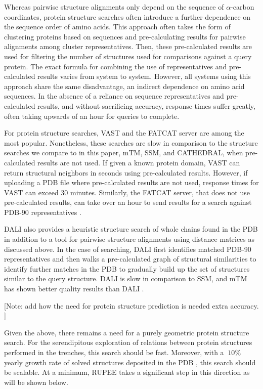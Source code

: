 \documentclass[10pt,letterpaper]{article}
\newcommand{\ca}{$\alpha$-carbon\xspace}
\begin{document}
Whereas pairwise structure alignments only depend on the sequence of \ca coordinates, protein structure searches often introduce a further dependence on the sequence order of amino acids.
This approach often takes the form of clustering proteins based on sequences and pre-calculating results for pairwise alignments among cluster representatives. 
Then, these pre-calculated results are used for filtering the number of structures used for comparisons against a query protein.
The exact formula for combining the use of representatives and pre-calculated results varies from system to system.
However, all systems using this approach share the same disadvantage, an indirect dependence on amino acid sequences. 
In the absence of a reliance on sequence representatives and pre-calculated results, and without sacrificing accuracy, response times suffer greatly, often taking upwards of an hour for queries to complete. 

For protein structure searches, VAST \cite{Gilbrat1996} and the FATCAT server \cite{Ye2004} are among the most popular. 
Nonetheless, these searches are slow in comparison to the structure searches we compare to in this paper, mTM, SSM, and CATHEDRAL, when pre-calculated results are not used. 
If given a known protein domain, VAST can return structural neighbors in seconds using pre-calculated results. 
However, if uploading a PDB file where pre-calculated results are not used, response times for VAST can exceed 30 minutes. 
Similarly, the FATCAT server, that does not use pre-calculated results, can take over an hour to send results for a search against PDB-90 representatives \cite{Prlic2010}. 

DALI also provides a heuristic structure search \cite{Holm2010} of whole chains found in the PDB in addition to a tool for pairwise structure alignments using distance matrices as discussed above. 
In the case of searching, DALI first identifies matched PDB-90 representatives and then walks a pre-calculated graph of structural similarities to identify further matches in the PDB to gradually build up the set of structures similar to the query structure. 
DALI is slow in comparison to SSM, and mTM has shown better quality results than DALI \cite{Dong2018}.

[Note: add how the need for protein structure prediction is needed extra accuracy. ]


Given the above, there remains a need for a purely geometric protein structure search.
For the serendipitous exploration of relations between protein structures performed in the trenches, this search should be fast. 
Moreover, with a $~10\%$ yearly growth rate of solved structures deposited in the PDB \cite{gkw1000}, this search should be scalable. 
At a minimum, RUPEE takes a significant step in this direction as will be shown below. 
\end{document}
